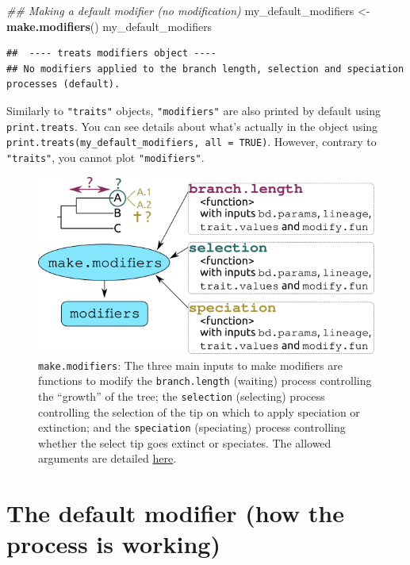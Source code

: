 \documentclass[
]{book}
\newenvironment{Shaded}{\begin{snugshade}}{\end{snugshade}}
\newcommand{\CommentTok}[1]{\textcolor[rgb]{0.56,0.35,0.01}{\textit{#1}}}
\newcommand{\KeywordTok}[1]{\textcolor[rgb]{0.13,0.29,0.53}{\textbf{#1}}}
\newcommand{\NormalTok}[1]{#1}
\newcommand{\StringTok}[1]{\textcolor[rgb]{0.31,0.60,0.02}{#1}}
\begin{document}
\begin{Shaded}
\begin{Highlighting}[]
\CommentTok{\#\# Making a default modifier (no modification)}
\NormalTok{my\_default\_modifiers \textless{}{-}}\StringTok{ }\KeywordTok{make.modifiers}\NormalTok{()}
\NormalTok{my\_default\_modifiers}
\end{Highlighting}
\end{Shaded}

\begin{verbatim}
##  ---- treats modifiers object ---- 
## No modifiers applied to the branch length, selection and speciation processes (default).
\end{verbatim}

Similarly to \texttt{"traits"} objects, \texttt{"modifiers"} are also printed by default using \texttt{print.treats}.
You can see details about what's actually in the object using \texttt{print.treats(my\_default\_modifiers,\ all\ =\ TRUE)}.
However, contrary to \texttt{"traits"}, you cannot plot \texttt{"modifiers"}.

\begin{figure}
\centering
\includegraphics{make.modifiers.png}
\caption{\texttt{make.modifiers}: The three main inputs to make modifiers are functions to modify the \texttt{branch.length} (waiting) process controlling the ``growth'' of the tree; the \texttt{selection} (selecting) process controlling the selection of the tip on which to apply speciation or extinction; and the \texttt{speciation} (speciating) process controlling whether the select tip goes extinct or speciates. The allowed arguments are detailed \protect\hyperlink{allowarguments}{here}.}
\end{figure}

\hypertarget{the-default-modifier-how-the-process-is-working}{%
\section{The default modifier (how the process is working)}\label{the-default-modifier-how-the-process-is-working}}
\end{document}
